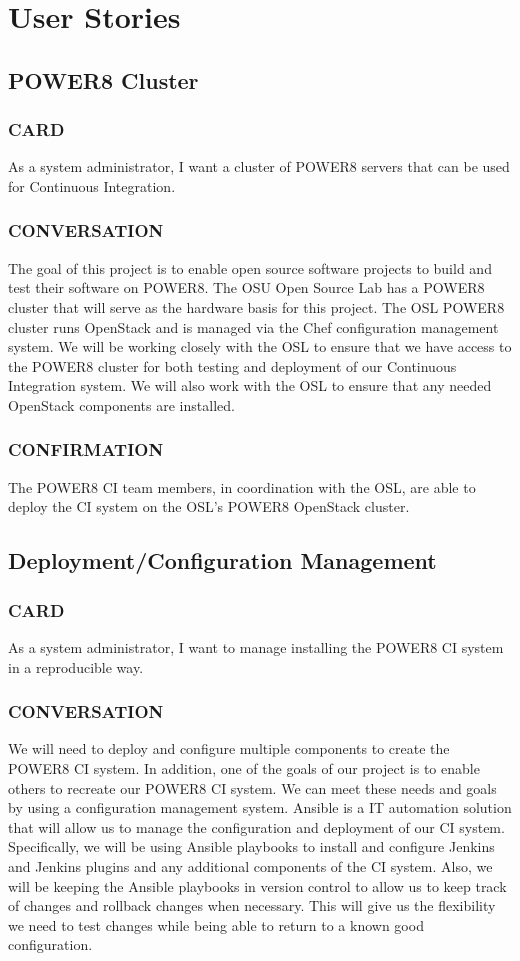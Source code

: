 \documentclass[10pt,letterpaper,onecolumn,journal]{IEEEtran}
\begin{document}
\section{User Stories}
\subsection{POWER8 Cluster}
\subsubsection{CARD}
As a system administrator, I want a cluster of POWER8 servers that can be used for Continuous Integration.
\subsubsection{CONVERSATION}
The goal of this project is to enable open source software projects to build and test their software on POWER8.
The OSU Open Source Lab has a POWER8 cluster that will serve as the hardware basis for this project.
The OSL POWER8 cluster runs OpenStack and is managed via the Chef configuration management system.
We will be working closely with the OSL to ensure that we have access to the POWER8 cluster for both testing and deployment of our Continuous Integration system.
We will also work with the OSL to ensure that any needed OpenStack components are installed.
\subsubsection{CONFIRMATION}
The POWER8 CI team members, in coordination with the OSL, are able to deploy the CI system on the OSL's POWER8 OpenStack cluster.

\subsection{Deployment/Configuration Management}
\subsubsection{CARD}
As a system administrator, I want to manage installing the POWER8 CI system in a reproducible way.
\subsubsection{CONVERSATION}
We will need to deploy and configure multiple components to create the POWER8 CI system.
In addition, one of the goals of our project is to enable others to recreate our POWER8 CI system.
We can meet these needs and goals by using a configuration management system.
Ansible is a IT automation solution that will allow us to manage the configuration and deployment of our CI system.
Specifically, we will be using Ansible playbooks to install and configure Jenkins and Jenkins plugins and any additional components of the CI system. 
Also, we will be keeping the Ansible playbooks in version control to allow us to keep track of changes and rollback changes when necessary.
This will give us the flexibility we need to test changes while being able to return to a known good configuration.
\end{document}
